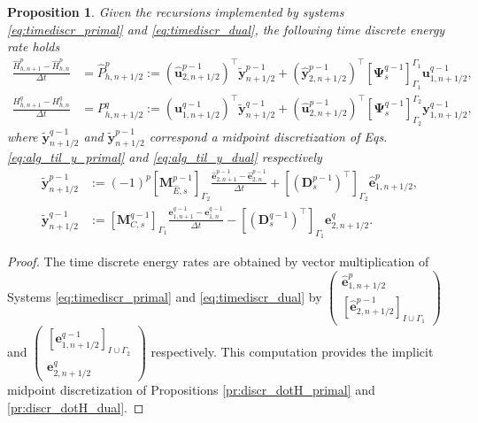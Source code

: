 \documentclass{elsarticle}
\newtheorem{proposition}{Proposition}
\newcommand*{\dual}[1]{\ensuremath{\widehat{#1}}}
\begin{document}
\begin{proposition}\label{pr:discrtime_energyrate}
Given the recursions implemented by systems \eqref{eq:timediscr_primal} and \eqref{eq:timediscr_dual}, the following time discrete energy rate holds
\begin{equation}
\begin{aligned}
    \frac{\dual{H}^{p}_{h, n+1} - \dual{H}^{p}_{h, n}}{\Delta t} &= \dual{P}_{h, n+1/2}^{p} := (\dual{\mathbf{u}}^{p-1}_{2, n+1/2})^\top \widetilde{\mathbf{y}}^{p-1}_{n+1/2} +  (\dual{\mathbf{y}}^{p-1}_{2, n+1/2})^\top [\mathbf{\Psi}^{q-1}_{s}]_{\Gamma_1}^{\Gamma_1} \mathbf{u}^{q-1}_{1, n+1/2}, \\
    \frac{H^{q}_{h, n+1} - H^{q}_{h, n}}{\Delta t} 
    &= P_{h, n+1/2}^{q} := (\mathbf{u}^{q-1}_{1, n+1/2})^\top \widetilde{\mathbf{y}}^{q-1}_{n+1/2} +  (\dual{\mathbf{u}}^{p-1}_{2, n+1/2})^\top [\mathbf{\Psi}^{q-1}_{s}]_{\Gamma_2}^{\Gamma_2} \mathbf{y}^{q-1}_{1, n+1/2},
\end{aligned}
\end{equation}
where $\widetilde{\mathbf{y}}^{q-1}_{n+1/2}$ and $\widetilde{\mathbf{y}}^{p-1}_{n+1/2}$ correspond a midpoint discretization of Eqs. \eqref{eq:alg_til_y_primal} and \eqref{eq:alg_til_y_dual} respectively
\begin{equation}
\begin{aligned}
\widetilde{\mathbf{y}}^{p-1}_{n+1/2} &:= (-1)^p [\mathbf{M}^{p-1}_{\dual{E}, s}]_{\Gamma_2} \frac{\dual{\mathbf{e}}^{p-1}_{2, n+1}-\dual{\mathbf{e}}^{p-1}_{2, n}}{\Delta t}  +[(\mathbf{D}_{s}^{p-1})^\top]_{\Gamma_2} \dual{\mathbf{e}}^p_{1, n+1/2}, \\
\widetilde{\mathbf{y}}^{q-1}_{n+1/2} &:= [\mathbf{M}^{q-1}_{{C}, s}]_{\Gamma_1} \frac{\mathbf{e}^{q-1}_{1, n+1} - \mathbf{e}^{q-1}_{1, n}}{\Delta t} -[(\mathbf{D}_{s}^{q-1})^\top]_{\Gamma_1} {\mathbf{e}}^q_{2, n+1/2}.
\end{aligned}
\end{equation}
\end{proposition}
\begin{proof}
The time discrete energy rates are obtained by vector multiplication of Systems \eqref{eq:timediscr_primal} and \eqref{eq:timediscr_dual} by $\begin{pmatrix}
    \dual{\mathbf{e}}^p_{1, n+1/2} \\ [\dual{\mathbf{e}}^{p-1}_{2, n+1/2}]_{I\cup \Gamma_1}
\end{pmatrix}$ and $\begin{pmatrix}
    [\mathbf{e}^{q-1}_{1, n+1/2}]_{I\cup \Gamma_2} \\ {\mathbf{e}}^q_{2, n+1/2}
    \end{pmatrix}$ respectively. This computation provides the implicit midpoint discretization of Propositions \ref{pr:discr_dotH_primal} and \ref{pr:discr_dotH_dual}.
\end{proof}
\end{document}
